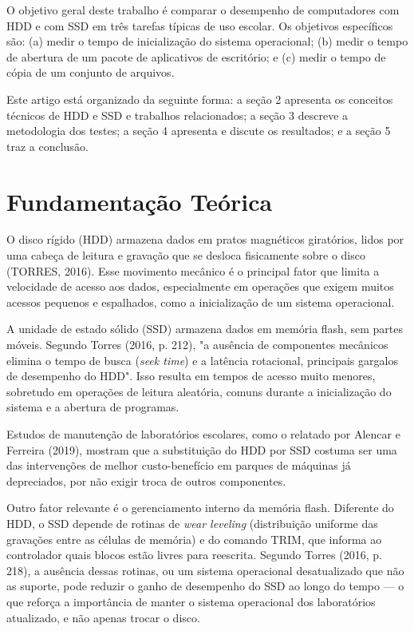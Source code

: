 \documentclass[article,12pt,a4paper]{abntex2}
\begin{document}
O objetivo geral deste trabalho é comparar o desempenho de computadores com
HDD e com SSD em três tarefas típicas de uso escolar. Os objetivos
específicos são: (a) medir o tempo de inicialização do sistema operacional;
(b) medir o tempo de abertura de um pacote de aplicativos de escritório; e
(c) medir o tempo de cópia de um conjunto de arquivos.

Este artigo está organizado da seguinte forma: a seção 2 apresenta os
conceitos técnicos de HDD e SSD e trabalhos relacionados; a seção 3 descreve
a metodologia dos testes; a seção 4 apresenta e discute os resultados; e a
seção 5 traz a conclusão.

\section{Fundamentação Teórica}

O disco rígido (HDD) armazena dados em pratos magnéticos giratórios, lidos
por uma cabeça de leitura e gravação que se desloca fisicamente sobre o
disco (TORRES, 2016). Esse movimento mecânico é o principal fator que limita
a velocidade de acesso aos dados, especialmente em operações que exigem
muitos acessos pequenos e espalhados, como a inicialização de um sistema
operacional.

A unidade de estado sólido (SSD) armazena dados em memória flash, sem partes
móveis. Segundo Torres (2016, p. 212), "a ausência de componentes mecânicos
elimina o tempo de busca (\textit{seek time}) e a latência rotacional,
principais gargalos de desempenho do HDD". Isso resulta em tempos de acesso
muito menores, sobretudo em operações de leitura aleatória, comuns durante
a inicialização do sistema e a abertura de programas.

Estudos de manutenção de laboratórios escolares, como o relatado por Alencar
e Ferreira (2019), mostram que a substituição do HDD por SSD costuma ser uma
das intervenções de melhor custo-benefício em parques de máquinas já
depreciados, por não exigir troca de outros componentes.

Outro fator relevante é o gerenciamento interno da memória flash. Diferente
do HDD, o SSD depende de rotinas de \textit{wear leveling} (distribuição
uniforme das gravações entre as células de memória) e do comando TRIM, que
informa ao controlador quais blocos estão livres para reescrita. Segundo
Torres (2016, p. 218), a ausência dessas rotinas, ou um sistema operacional
desatualizado que não as suporte, pode reduzir o ganho de desempenho do SSD
ao longo do tempo — o que reforça a importância de manter o sistema
operacional dos laboratórios atualizado, e não apenas trocar o disco.
\end{document}
